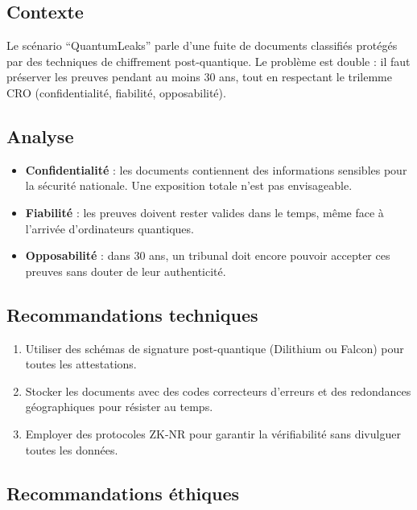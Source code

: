 \documentclass[12pt,a4paper]{report}
\begin{document}
	\subsection*{Contexte}
	
	Le scénario ``QuantumLeaks'' parle d'une fuite de documents classifiés protégés par 
	des techniques de chiffrement post-quantique. Le problème est double : 
	il faut préserver les preuves pendant au moins 30 ans, tout en respectant le trilemme CRO 
	(confidentialité, fiabilité, opposabilité). 
	
	\subsection*{Analyse}
	
	\begin{itemize}
		\item \textbf{Confidentialité} : les documents contiennent des informations sensibles 
		pour la sécurité nationale. Une exposition totale n'est pas envisageable.
		\item \textbf{Fiabilité} : les preuves doivent rester valides dans le temps, même 
		face à l'arrivée d'ordinateurs quantiques.
		\item \textbf{Opposabilité} : dans 30 ans, un tribunal doit encore pouvoir accepter 
		ces preuves sans douter de leur authenticité.
	\end{itemize}
	
	\subsection*{Recommandations techniques}
	
	\begin{enumerate}
		\item Utiliser des schémas de signature post-quantique (Dilithium ou Falcon) 
		pour toutes les attestations.
		\item Stocker les documents avec des codes correcteurs d’erreurs et des redondances 
		géographiques pour résister au temps.
		\item Employer des protocoles ZK-NR pour garantir la vérifiabilité sans divulguer 
		toutes les données.
	\end{enumerate}
	
	\subsection*{Recommandations éthiques}
	
\end{document}
